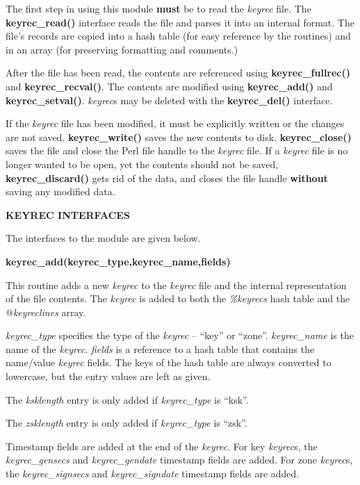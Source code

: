 The first step in using this module {\bf must} be to read the {\it keyrec}
file.  The {\bf keyrec\_read()} interface reads the file and parses it
into an internal format.  The file's records are copied into a hash
table (for easy reference by the 
routines) and in an array (for preserving formatting and comments.)

After the file has been read, the contents are referenced using
{\bf keyrec\_fullrec()} and {\bf keyrec\_recval()}.  The contents are modified
using {\bf keyrec\_add()} and {\bf keyrec\_setval()}.  {\it keyrec}s may be
deleted with the {\bf keyrec\_del()} interface.

If the {\it keyrec} file has been modified, it must be explicitly written or
the changes are not saved.  {\bf keyrec\_write()} saves the new contents to
disk.  {\bf keyrec\_close()} saves the file and close the Perl file handle to
the {\it keyrec} file.  If a {\it keyrec} file is no longer wanted to be open,
yet the contents should not be saved, {\bf keyrec\_discard()} gets rid of the
data, and closes the file handle {\bf without} saving any modified data.

{\bf KEYREC INTERFACES}

The interfaces to the  module are given
below.

{\bf keyrec\_add(keyrec\_type,keyrec\_name,fields)}

This routine adds a new {\it keyrec} to the {\it keyrec} file and the internal
representation of the file contents.  The {\it keyrec} is added to both the
{\it \%keyrecs} hash table and the {\it $@$keyreclines} array.

{\it keyrec\_type} specifies the type of the {\it keyrec} -- ``key'' or
``zone''.  {\it keyrec\_name} is the name of the {\it keyrec}.  {\it fields}
is a reference to a hash table that contains the name/value {\it keyrec}
fields.  The keys of the hash table are always converted to lowercase, but
the entry values are left as given.

The {\it ksklength} entry is only added if {\it keyrec\_type} is ``ksk''.

The {\it zsklength} entry is only added if {\it keyrec\_type} is ``zsk''.

Timestamp fields are added at the end of the {\it keyrec}.  For key
{\it keyrec}s, the {\it keyrec\_gensecs} and {\it keyrec\_gendate} timestamp
fields are added.  For zone {\it keyrec}s, the {\it keyrec\_signsecs} and
{\it keyrec\_signdate} timestamp fields are added.


